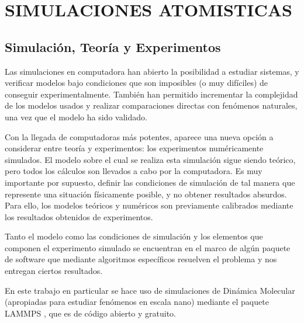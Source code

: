 
\chapter{SIMULACIONES ATOMISTICAS} %

\label{C2} %



\section{Simulación, Teoría y Experimentos}
\label{S2_1}

Las simulaciones en computadora han abierto la posibilidad a estudiar sistemas, y verificar modelos bajo condiciones que son imposibles (o muy difíciles) de conseguir experimentalmente. También han permitido incrementar la complejidad de los modelos usados y realizar comparaciones directas con fenómenos naturales, una vez que el modelo ha sido validado.

Con la llegada de computadoras más potentes, aparece una nueva opción a considerar entre teoría y experimentos: los experimentos numéricamente simulados. El modelo sobre el cual se realiza esta simulación sigue siendo teórico, pero todos los cálculos son llevados a cabo por la computadora. Es muy importante por supuesto, definir las condiciones de simulación de tal manera que represente una situación físicamente posible, y no obtener resultados absurdos. Para ello, los modelos teóricos y numéricos son previamente calibrados mediante los resultados obtenidos de experimentos.

Tanto el modelo como las condiciones de simulación y los elementos que componen el experimento simulado se encuentran en el marco de algún paquete de software que mediante algoritmos específicos resuelven el problema y nos entregan ciertos resultados.

En este trabajo en particular se hace uso de simulaciones de Dinámica Molecular (apropiadas para estudiar fenómenos en escala nano) mediante el paquete LAMMPS \citep{plimpton95}, que es de código abierto y gratuito.


